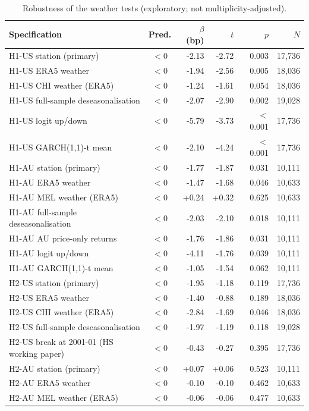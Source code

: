 \begin{table}[htbp]\centering\footnotesize
\caption{Robustness of the weather tests (exploratory; not multiplicity-adjusted).}
\label{tab:robust_weather}
\begin{tabular}{lcrrrr}\toprule
Specification & Pred. & $\beta$ (bp) & $t$ & $p$ & $N$ \\ \midrule
H1-US station (primary) & $<$0 & -2.13 & -2.72 & 0.003 & 17,736 \\
H1-US ERA5 weather & $<$0 & -1.94 & -2.56 & 0.005 & 18,036 \\
H1-US CHI weather (ERA5) & $<$0 & -1.24 & -1.61 & 0.054 & 18,036 \\
H1-US full-sample deseasonalisation & $<$0 & -2.07 & -2.90 & 0.002 & 19,028 \\
H1-US logit up/down & $<$0 & -5.79 & -3.73 & $<$0.001 & 17,736 \\
H1-US GARCH(1,1)-t mean & $<$0 & -2.10 & -4.24 & $<$0.001 & 17,736 \\
H1-AU station (primary) & $<$0 & -1.77 & -1.87 & 0.031 & 10,111 \\
H1-AU ERA5 weather & $<$0 & -1.47 & -1.68 & 0.046 & 10,633 \\
H1-AU MEL weather (ERA5) & $<$0 & +0.24 & +0.32 & 0.625 & 10,633 \\
H1-AU full-sample deseasonalisation & $<$0 & -2.03 & -2.10 & 0.018 & 10,111 \\
H1-AU AU price-only returns & $<$0 & -1.76 & -1.86 & 0.031 & 10,111 \\
H1-AU logit up/down & $<$0 & -4.11 & -1.76 & 0.039 & 10,111 \\
H1-AU GARCH(1,1)-t mean & $<$0 & -1.05 & -1.54 & 0.062 & 10,111 \\
H2-US station (primary) & $<$0 & -1.95 & -1.18 & 0.119 & 17,736 \\
H2-US ERA5 weather & $<$0 & -1.40 & -0.88 & 0.189 & 18,036 \\
H2-US CHI weather (ERA5) & $<$0 & -2.84 & -1.69 & 0.046 & 18,036 \\
H2-US full-sample deseasonalisation & $<$0 & -1.97 & -1.19 & 0.118 & 19,028 \\
H2-US break at 2001-01 (HS working paper) & $<$0 & -0.43 & -0.27 & 0.395 & 17,736 \\
H2-AU station (primary) & $<$0 & +0.07 & +0.06 & 0.523 & 10,111 \\
H2-AU ERA5 weather & $<$0 & -0.10 & -0.10 & 0.462 & 10,633 \\
H2-AU MEL weather (ERA5) & $<$0 & -0.06 & -0.06 & 0.477 & 10,633 \\

\end{tabular}
\end{table}
